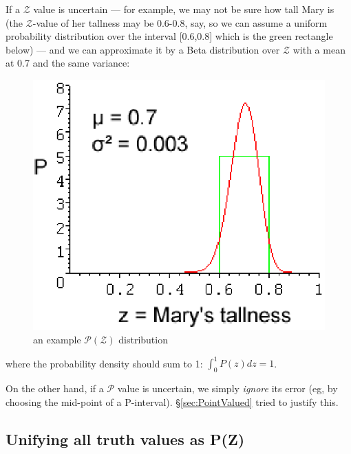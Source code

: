 If a $\mathcal{Z}$ value is uncertain --- for example, we may not be sure how tall Mary is (the $\mathcal{Z}$-value of her tallness may be 0.6-0.8, say, so we can assume a uniform probability distribution over the interval [0.6,0.8] which is the green rectangle below) --- and we can approximate it by a Beta distribution over $\mathcal{Z}$ with a mean at 0.7 and the same variance:
\begin{figure}[H]
\centering
\includegraphics[scale=0.7]{P-over-Z-Marys-Tallness2.eps}
\caption{an example $\mathcal{P}(\mathcal{Z})$ distribution}
\end{figure}
where the probability density should sum to 1: $ \int^1_0 P(z) dz = 1 $.

On the other hand, if a $\mathcal{P}$ value is uncertain, we simply \textit{ignore} its error (eg, by choosing the mid-point of a P-interval).  \S\ref{sec:PointValued} tried to justify this.

\subsection{Unifying all truth values as P(Z)}

